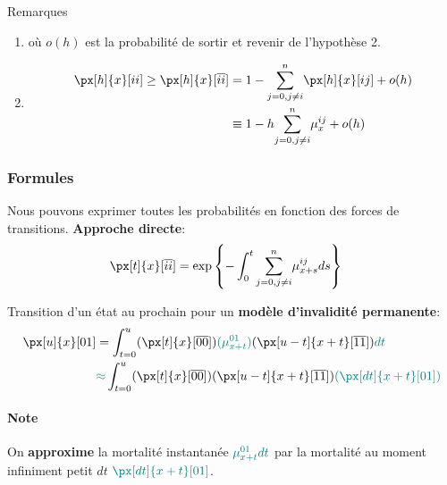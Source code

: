 \documentclass[10pt, french]{article}
\begin{document}
\begin{multicols*}{2}
\begin{conceptgen}{Remarques}
\begin{enumerate}[leftmargin = *]
	\item	{} où $o(h)$ est la probabilité de sortir et revenir de l'hypothèse 2.
	\item	
	\begin{align*}
		\px[h]{x}[ii] 
		\geq \px[h]{x}[\overline{ii}] 	
		&= 1 - \sumz{n}{j = 0, j \neq i} \px[h]{x}[ij] + o(h) 	\\
		&\equiv 1 - h \sumz{n}{j = 0, j \neq i} \mu_{x}^{ij} + o(h)
	\end{align*}
\end{enumerate}
\end{conceptgen}

\columnbreak
\subsubsection*{Formules}
Nous pouvons exprimer toutes les probabilités en fonction des forces de transitions. 
\textbf{Approche directe}:
\begin{align*}
	\px[t]{x}[\overline{ii}]
	&=	\text{exp}\left\{	-\int_{0}^{t}\sumz{n}{j = 0, j \neq i} \mu_{x + s}^{ij} ds\right\}
\end{align*}

Transition d'un état au prochain pour un \textbf{modèle d'invalidité permanente}:
\begin{align*}
	\px[u]{x}[01] 
	&=	\int_{t = 0}^{u} (\px[t]{x}[\overline{00}]) \textcolor{teal}{(\mu_{x + t}^{01})} (\px[u - t]{x + t}[\overline{11}]) \textcolor{teal}{dt}	\\
	&{\color{teal}\approx}	\int_{t = 0}^{u} (\px[t]{x}[\overline{00}]) (\px[u - t]{x + t}[\overline{11}]) \textcolor{teal}{(\px[dt]{x + t}[01])}
\end{align*}
\paragraph{Note}	On \textbf{\color{teal}approxime} la mortalité instantanée $\color{teal}\mu_{x + t}^{01}dt$ par la mortalité au moment infiniment petit $dt$ $\color{teal}\px[dt]{x + t}[01]$.\\


\end{multicols*}
\end{document}
